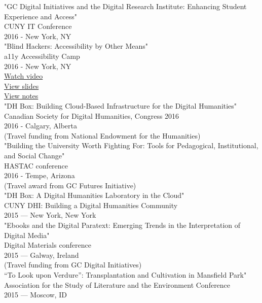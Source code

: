 \documentclass[11pt]{article}
\begin{document}
"GC Digital Initiatives and the Digital Research Institute: Enhancing Student Experience and Access"\\
CUNY IT Conference\\
2016 - New York, NY\\

"Blind Hackers: Accessibility by Other Means"\\
a11y Accessibility Camp\\
2016 - New York, NY\\
\href{https://www.youtube.com/watch?v=W8_O3joo4aU}{Watch video}\\
\href{http://htmlpreview.github.io/?https://github.com/smythp/blind-hackers/blob/master/presentation/foo.html}{View slides}\\
\href{https://github.com/smythp/blind-hackers}{View notes}\\

"DH Box: Building Cloud-Based Infrastructure for the Digital Humanities"\\
Canadian Society for Digital Humanities, Congress 2016\\
2016 - Calgary, Alberta\\
(Travel funding from National Endowment for the Humanities)\\

"Building the University Worth Fighting For: Tools for Pedagogical, Institutional, and Social Change"\\
HASTAC conference\\
2016 - Tempe, Arizona\\
(Travel award from GC Futures Initiative)\\

"DH Box: A Digital Humanities Laboratory in the Cloud"\\
CUNY DHI: Building a Digital Humanities Community\\
2015 — New York, New York\\

"Ebooks and the Digital Paratext: Emerging Trends in the Interpretation of Digital Media"\\
Digital Materials conference\\
2015 — Galway, Ireland\\
(Travel funding from GC Digital Initiatives)\\

“To Look upon Verdure”: Transplantation and Cultivation in Mansfield Park"\\
Association for the Study of Literature and the Environment Conference\\
2015 — Moscow, ID\\
\end{document}
